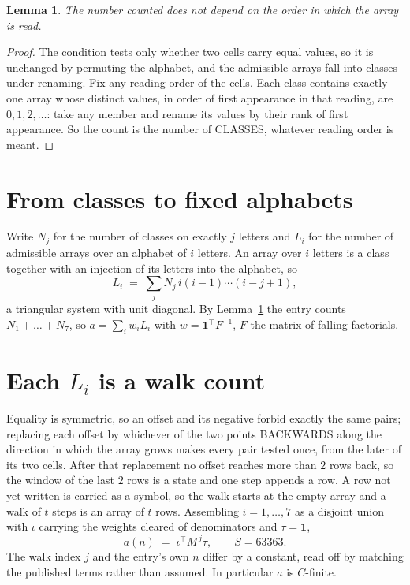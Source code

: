 \documentclass[11pt,a4paper]{article}
\theoremstyle{plain}
\newtheorem{lemma}[theorem]{Lemma}
\theoremstyle{definition}
\begin{document}
\begin{lemma}\label{lem:order}
The number counted does not depend on the order in which the array is read.
\end{lemma}

\begin{proof}
The condition tests only whether two cells carry equal values, so it is unchanged by permuting
the alphabet, and the admissible arrays fall into classes under renaming. Fix any reading order
of the cells. Each class contains exactly one array whose distinct values, in order of first
appearance in that reading, are $0,1,2,\dots$: take any member and rename its values by their
rank of first appearance. So the count is the number of CLASSES, whatever reading order is
meant.
\end{proof}

\section{From classes to fixed alphabets}

Write $N_j$ for the number of classes on exactly $j$ letters and $L_i$ for the number of
admissible arrays over an alphabet of $i$ letters. An array over $i$ letters is a class together
with an injection of its letters into the alphabet, so
\[
L_i\;=\;\sum_j N_j\,i(i-1)\cdots(i-j+1),
\]
a triangular system with unit diagonal. By Lemma~\ref{lem:order} the entry counts
$N_1+\dots+N_{7}$, so $a=\sum_i w_iL_i$ with $w=\mathbf{1}^{\!\top}F^{-1}$, $F$ the
matrix of falling factorials.

\section{Each $L_i$ is a walk count}

Equality is symmetric, so an offset and its negative forbid exactly the same pairs; replacing
each offset by whichever of the two points BACKWARDS along the direction in which the array
grows makes every pair tested once, from the later of its two cells. After that replacement no
offset reaches more than $2$ rows back, so the window of the last $2$
rows is a state and one step appends a row. A row not yet written is
carried as a symbol, so the walk starts at the empty array and a walk of $t$ steps is an array
of $t$ rows. Assembling $i=1,\dots,7$ as a disjoint union with $\iota$ carrying the
weights cleared of denominators and $\tau=\mathbf{1}$,
\[
a(n)\;=\;\iota^{\!\top}M^{\,j}\tau ,\qquad S=63363.
\]
The walk index $j$ and the entry's own $n$ differ by a constant, read off by matching the
published terms rather than assumed. In particular $a$ is $C$-finite.
\end{document}
